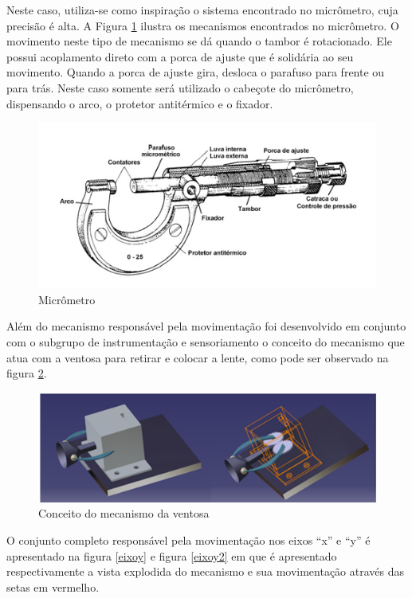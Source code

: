 Neste caso, utiliza-se como inspiração o sistema encontrado no micrômetro, cuja precisão é alta. A Figura \ref{micro} ilustra os mecanismos encontrados no micrômetro. O movimento neste tipo de mecanismo se dá quando o tambor é rotacionado. Ele possui acoplamento direto com a porca de ajuste que é solidária ao seu movimento. Quando a porca de ajuste gira, desloca o parafuso para frente ou para trás. Neste caso somente será utilizado o cabeçote do micrômetro, dispensando o arco, o protetor antitérmico e o fixador.

\begin{figure}[H]
		\centering
			\includegraphics[scale=1.0]{figuras/micro.png}
		\caption{Micrômetro}
		\label{micro}
\end{figure}

Além do mecanismo responsável pela movimentação foi desenvolvido em conjunto com o subgrupo de instrumentação e sensoriamento o conceito do mecanismo que atua com a ventosa para retirar e colocar a lente, como pode ser observado na figura \ref{ventosa}.

\begin{figure}[H]
		\centering
			\includegraphics[scale=1.0]{figuras/ventosa.png}
		\caption{Conceito do mecanismo da ventosa}
		\label{ventosa}
\end{figure}

O conjunto completo responsável pela movimentação nos eixos “x” e “y” é apresentado na figura \ref{eixoy} e figura \ref{eixoy2}  em que é apresentado respectivamente a vista explodida do mecanismo e sua movimentação através das setas em vermelho.

